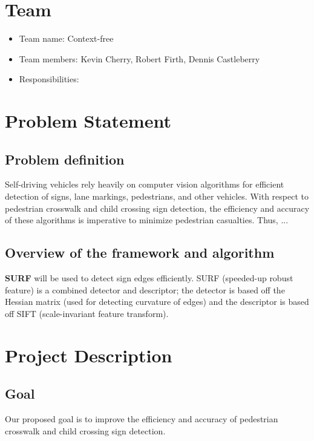 \documentclass{article}
\begin{document}
\section{Team}

\begin{itemize}
 \item Team name: Context-free
 \item Team members: Kevin Cherry, Robert Firth, Dennis Castleberry
 \item Responsibilities: 
\end{itemize}

\section{Problem Statement}

\subsection{Problem definition}

Self-driving vehicles rely heavily on computer vision algorithms for efficient
detection of signs, lane markings, pedestrians, and other vehicles.  With
respect to pedestrian crosswalk and child crossing sign detection, the
efficiency and accuracy of these algorithms is imperative to minimize
pedestrian casualties. Thus, ...

\subsection{Overview of the framework and algorithm}

\textbf{SURF} will be used to detect sign edges efficiently.  SURF (speeded-up
robust feature) is a combined detector and descriptor; the detector is based
off the Hessian matrix (used for detecting curvature of edges) and the
descriptor is based off SIFT (scale-invariant feature transform).

\section{Project Description}

\subsection{Goal}

Our proposed goal is to improve the efficiency and accuracy of 
pedestrian crosswalk and child crossing sign detection.
\end{document}
